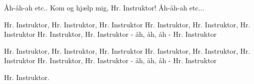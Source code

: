 \documentclass[a4paper,11pt]{article}
\begin{document}
\begin{song}
 Åh-åh-ah etc.. Kom og hjælp mig, Hr. Instruktor! Åh-åh-ah etc...

%
Hr. Instruktor, Hr. Instruktor, Hr. Instruktor
Hr. Instruktor, Hr. Instruktor, Hr. Instruktor
Hr. Instruktor, Hr. Instruktor - åh, åh, åh - Hr. Instruktor

Hr. Instruktor, Hr. Instruktor, Hr. Instruktor
Hr. Instruktor, Hr. Instruktor, Hr. Instruktor
Hr. Instruktor, Hr. Instruktor - åh, åh, åh - Hr. Instruktor


 Hr. Instruktor.



\end{song}
\end{document}
